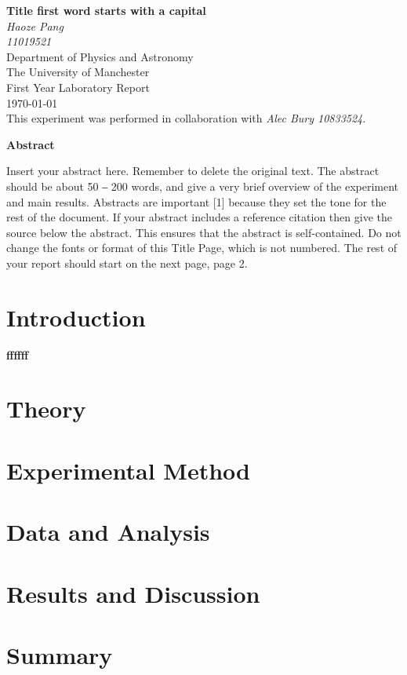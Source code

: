 \documentclass[a4paper,12pt]{article}
\begin{document}
{\pagestyle{empty}
	\begin{center}
		{\LARGE\bfseries Title first word starts with a capital\\
		
		}
		\vspace{\baselineskip}
		{\itshape Haoze Pang \\
			11019521\\
		}
		\vspace{\baselineskip}	
		Department of Physics and Astronomy\\
		The University of Manchester\\
		\vspace{\baselineskip}	
		First Year Laboratory Report\\
		\vspace{\baselineskip}	
		{\today}\\
		\vspace{2\baselineskip}		
		This experiment was performed in collaboration with \textit{Alec Bury 10833524}.
	\end{center}
	\vspace{4\baselineskip}
	\textbf{Abstract}
	
	Insert your abstract here.  Remember to delete the original text.  The abstract should be about 50 ‒ 200 words, and give a very brief overview of the experiment and main results.  Abstracts are important [1] because they set the tone for the rest of the document.  If your abstract includes a reference citation then give the source below the abstract.  This ensures that the abstract is self-contained.  Do not change the fonts or format of this Title Page, which is not numbered.  The rest of your report should start on the next page, page 2.
\clearpage}
\section{Introduction}
\bfseries
ffffff
\section{Theory}
\section{Experimental Method}
\section{Data and Analysis}
\section{Results and Discussion}
\section{Summary}
\end{document}
